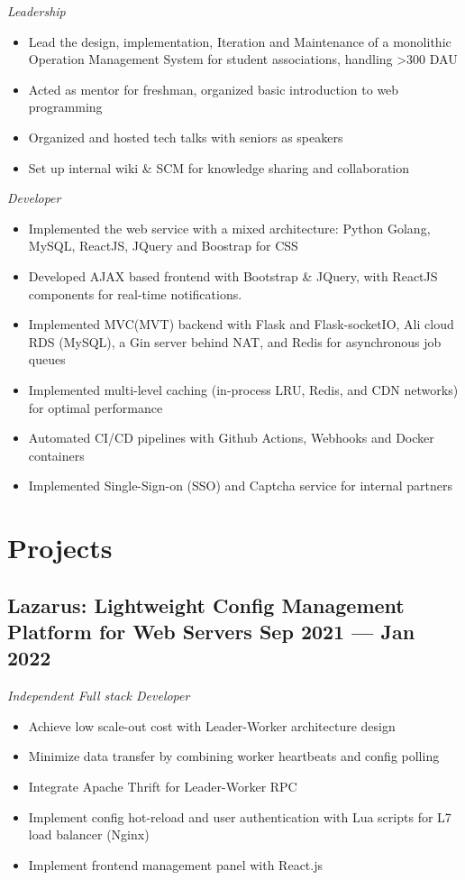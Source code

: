 \documentclass[a4,12pt]{article}
\newcommand{\subtext}[1]{
#1\par\vspace{-0.3cm}}
\newenvironment{zitemize}{
\begin{itemize}\itemsep0pt \parskip0pt \parsep1pt}
{\end{itemize}\vspace{-0.5cm}}
\begin{document}
\subtext{\textit{Leadership}}
\begin{zitemize}
    \item Lead the design, implementation, Iteration and Maintenance of a monolithic Operation Management System for student associations, handling >300 DAU
    \item Acted as mentor for freshman, organized basic introduction to web programming
    \item Organized and hosted tech talks with seniors as speakers
    \item Set up internal wiki \& SCM for knowledge sharing and collaboration
\end{zitemize}

\subtext{\textit{Developer}}
    \begin{zitemize}
        \item Implemented the web service with a mixed architecture: Python Golang, MySQL, ReactJS, JQuery and Boostrap for CSS
        \item Developed AJAX based frontend with Bootstrap \& JQuery, with ReactJS components for real-time notifications.
        \item Implemented MVC(MVT) backend with Flask and Flask-socketIO, Ali cloud RDS (MySQL), a Gin server behind NAT, and Redis for asynchronous job queues
        \item Implemented multi-level caching (in-process LRU, Redis, and CDN networks) for optimal performance
        \item Automated CI/CD pipelines with Github Actions, Webhooks and Docker containers
        \item Implemented Single-Sign-on (SSO) and Captcha service for internal partners 
    \end{zitemize}

\section{\textbf{Projects}}

\subsection*{Lazarus: {\normalsize\normalfont Lightweight Config Management Platform for Web Servers} \hfill \textbf{Sep 2021 --- Jan 2022}}
\subtext{\textit{Independent Full stack Developer}}
\begin{zitemize}
    \item Achieve low scale-out cost with Leader-Worker architecture design
    \item Minimize data transfer by combining worker heartbeats and config polling
    \item Integrate Apache Thrift for Leader-Worker RPC
    \item Implement config hot-reload and user authentication with Lua scripts for L7 load balancer (Nginx)
    \item Implement frontend management panel with React.js
\end{zitemize}
\end{document}
